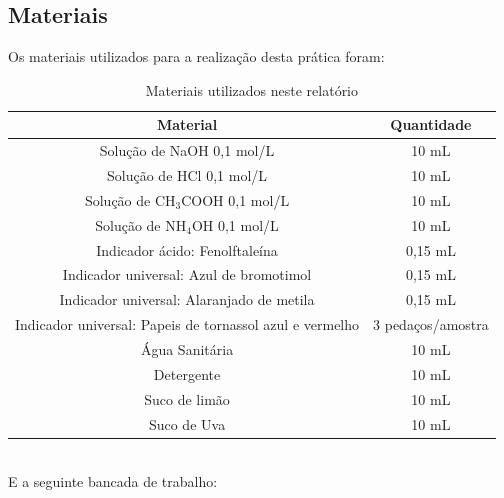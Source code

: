 \documentclass[a4paper, 11pt]{article}
\begin{document}
    \subsection{Materiais}\label{sec:mat_materiais}
    \indent Os materiais utilizados para a realização desta prática foram:
        \begin{table}[h]
        \label{tab:materiais}
        \centering
        \begin{tabular}{|c|c|}
            \hline
            \textbf{Material} & \textbf{Quantidade} \\
            \hline
            Solução de NaOH 0,1 mol/L & 10 mL \\
            \hline
            Solução de HCl 0,1 mol/L & 10 mL \\
            \hline
            Solução de CH$_3$COOH 0,1 mol/L & 10 mL \\
            \hline
            Solução de NH$_4$OH 0,1 mol/L & 10 mL \\
            \hline
            Indicador ácido: Fenolftaleína & 0,15 mL \\
            \hline
            Indicador universal: Azul de bromotimol & 0,15 mL \\
            \hline
            Indicador universal: Alaranjado de metila & 0,15 mL \\
            \hline
            Indicador universal: Papeis de tornassol azul e vermelho & 3 pedaços/amostra \\
            \hline
            Água Sanitária & 10 mL \\
            \hline
            Detergente & 10 mL \\
            \hline
            Suco de limão & 10 mL \\
            \hline
            Suco de Uva & 10 mL \\
            \hline
        \end{tabular}
            \caption{Materiais utilizados neste relatório}
    \end{table}\\
\newpage
    \indent E a seguinte bancada de trabalho:\\
\end{document}

